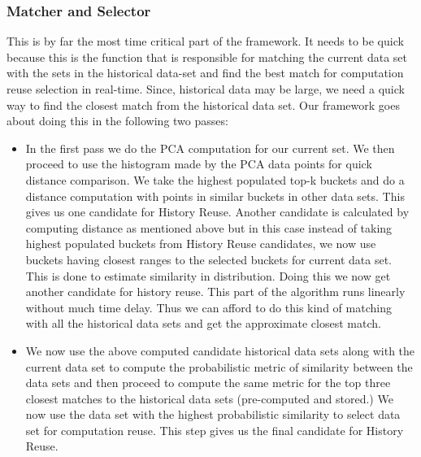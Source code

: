 \documentclass{vldb}
\begin{document}
\subsubsection{Matcher and Selector}
This is by far the most time critical part of the framework. It needs to be quick because this is the function that is responsible for matching the current data set with the sets in the historical data-set and find the best match for computation reuse selection in real-time. Since, historical data may be large, we need a quick way to find the closest match from the historical data set. Our framework goes about doing this in the following two passes:
\begin{itemize}
    \item In the first pass we do the PCA computation for our current set. We then proceed to use the histogram made by the PCA data points for quick distance comparison. We take the highest populated top-k buckets and do a distance computation with points in similar buckets in other data sets. This gives us one candidate for History Reuse. Another candidate is calculated by computing distance as mentioned above but in this case instead of taking highest populated buckets from History Reuse candidates, we now use buckets having closest ranges to the selected buckets for current data set. This is done to estimate similarity in distribution. Doing this we now get another candidate for history reuse. This part of the algorithm runs linearly without much time delay. Thus we can afford to do this kind of matching with all the historical data sets and get the approximate closest match.
    
    \item We now use the above computed candidate historical data sets along with the current data set to compute the probabilistic metric of similarity between the data sets and then proceed to compute the same metric for the top three closest matches to the historical data sets (pre-computed and stored.) We now use the data set with the highest probabilistic similarity to select data set for computation reuse. This step gives us the final candidate for History Reuse.
\end{itemize}
\end{document}

